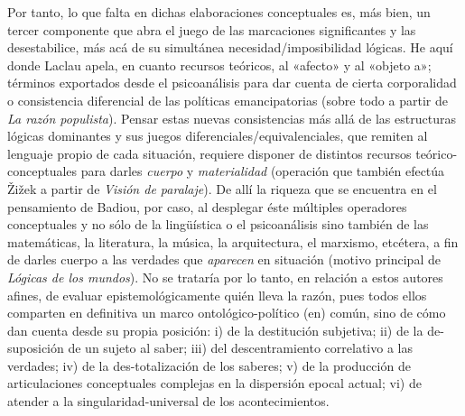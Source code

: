 Por tanto, lo que falta en dichas elaboraciones conceptuales es, más bien, un tercer componente que abra el juego de las marcaciones significantes y las desestabilice, más acá de su simultánea necesidad/imposibilidad lógicas. He aquí donde Laclau apela, en cuanto recursos teóricos, al «afecto» y al «objeto a»; términos exportados desde el psicoanálisis para dar cuenta de cierta corporalidad o consistencia diferencial de las políticas emancipatorias (sobre todo a partir de \emph{La razón populista}). Pensar estas nuevas consistencias más allá de las estructuras lógicas dominantes y sus juegos diferenciales/equivalenciales, que remiten al lenguaje propio de cada situación, requiere disponer de distintos recursos teórico-conceptuales para darles \emph{cuerpo} y \emph{materialidad} (operación que también efectúa Žižek a partir de \emph{Visión de paralaje}). De allí la riqueza que se encuentra en el pensamiento de Badiou, por caso, al desplegar éste múltiples operadores conceptuales y no sólo de la lingüística o el psicoanálisis sino también de las matemáticas, la literatura, la música, la arquitectura, el marxismo, etcétera, a fin de darles cuerpo a las verdades que \emph{aparecen} en situación (motivo principal de \emph{Lógicas de los mundos}). No se trataría por lo tanto, en relación a estos autores afines, de evaluar epistemológicamente quién lleva la razón, pues todos ellos comparten en definitiva un marco ontológico-político (en) común, sino de cómo dan cuenta desde su propia posición: i) de la destitución subjetiva; ii) de la de-suposición de un sujeto al saber; iii) del descentramiento correlativo a las verdades; iv) de la des-totalización de los saberes; v) de la producción de articulaciones conceptuales complejas en la dispersión epocal actual; vi) de atender a la singularidad-universal de los acontecimientos.


